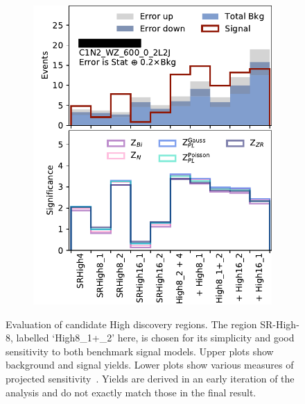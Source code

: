 \begin{figure}[tp]
\begin{subfigure}{0.48\textwidth}
\includegraphics[width=\textwidth]{figures/2ljets_disco_High_C1N2_WZ_600_0_2L2J.png}
\caption{}
\end{subfigure}
\caption[
Evaluation of candidate High discovery regions
]{%
Evaluation of candidate High discovery regions.
The region SR-High-8, labelled `High8\_1+\_2' here, is chosen for its
simplicity and good sensitivity to both benchmark signal models.
Upper plots show background and signal yields.
Lower plots show various measures of projected
sensitivity~\cite{cousins2008evaluation}.
Yields are derived in an early iteration of the analysis and do not exactly
match those in the final result.
}
\label{fig:2ljets_disco_trials_high}
\end{figure}

